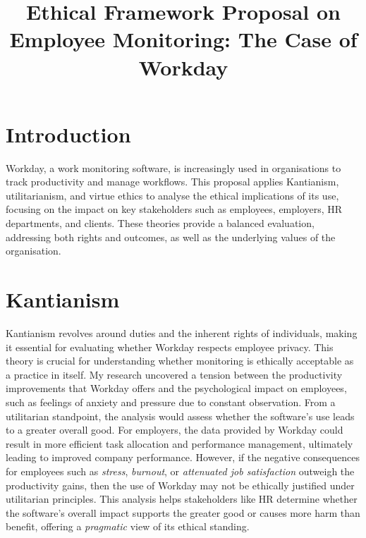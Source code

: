 \documentclass[a4paper]{article}
\title{\textbf{Ethical Framework Proposal on Employee Monitoring: The Case of Workday}}
\author{} %
\date{} %
\begin{document}
\maketitle
\thispagestyle{fancy}
\pagestyle{fancy}
\section*{Introduction}
Workday, a work monitoring software, is increasingly used in organisations to track productivity and manage workflows. This proposal applies Kantianism, utilitarianism, and virtue ethics to analyse the ethical implications of its use, focusing on the impact on key stakeholders such as employees, employers, HR departments, and clients. These theories provide a balanced evaluation, addressing both rights and outcomes, as well as the underlying values of the organisation.

\section*{Kantianism}
Kantianism revolves around duties and the inherent rights of individuals, making it essential for evaluating whether Workday respects employee privacy. This theory is crucial for understanding whether monitoring is ethically acceptable as a practice in itself.
My research uncovered a tension between the productivity improvements that Workday offers and the psychological impact on employees, such as feelings of anxiety and pressure due to constant observation. From a utilitarian standpoint, the analysis would assess whether the software’s use leads to a greater overall good. For employers, the data provided by Workday could result in more efficient task allocation and performance management, ultimately leading to improved company performance. However, if the negative consequences for employees such as \textit{stress}, \textit{burnout}, or \textit{attenuated job satisfaction} outweigh the productivity gains, then the use of Workday may not be ethically justified under utilitarian principles. This analysis helps stakeholders like HR determine whether the software's overall impact supports the greater good or causes more harm than benefit, offering a \textit{pragmatic} view of its ethical standing.
\end{document}
